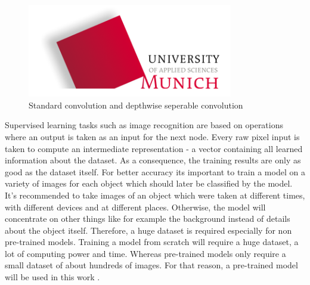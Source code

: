 \begin{figure}[htbp]
\includegraphics[width=0.8\textwidth]{includes/MUASlogo}
\caption[Standard convolution and depthwise seperable convolution]{Standard convolution and depthwise seperable convolution \citep{Howard2017}}
\label{fig:FH-Logo7}
\end{figure}
 		
Supervised learning tasks such as image recognition are based on operations where an output is taken as an input for the next node. Every raw pixel input is taken to compute an intermediate representation - a vector containing all learned information about the dataset. As a consequence, the training results are only as good as the dataset itself. For better accuracy its important to train a model on a variety of images for each object which should later be classified by the model. It's recommended to take images of an object which were taken at different times, with different devices and at different places. Otherwise, the model will concentrate on other things like for example the background instead of details about the object itself. Therefore, a huge dataset is required especially for non pre-trained models. Training a model from scratch will require a huge dataset, a lot of computing power and time. Whereas pre-trained models only require a small dataset of about hundreds of images. For that reason, a pre-trained model will be used in this work \citep{TensorFlowRetrain2017}.